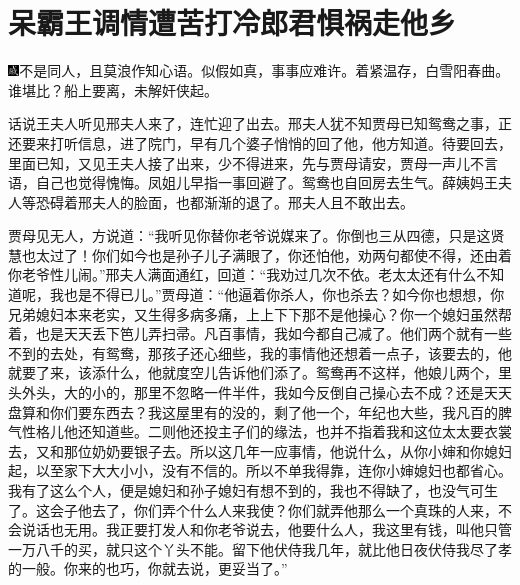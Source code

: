 

\chapter{呆霸王调情遭苦打\hspace{.5em}冷郎君惧祸走他乡}

{\includegraphics[width=3mm]{../Images/00005}不是同人，且莫浪作知心语。似假如真，事事应难许。着紧温存，白雪阳春曲。谁堪比？船上要离，未解奸侠起。}

话说王夫人听见邢夫人来了，连忙迎了出去。邢夫人犹不知贾母已知鸳鸯之事，正还要来打听信息，进了院门，早有几个婆子悄悄的回了他，他方知道。待要回去，里面已知，又见王夫人接了出来，少不得进来，先与贾母请安，贾母一声儿不言语，自己也觉得愧悔。凤姐儿早指一事回避了。鸳鸯也自回房去生气。薛姨妈王夫人等恐碍着邢夫人的脸面，也都渐渐的退了。邢夫人且不敢出去。

贾母见无人，方说道：``我听见你替你老爷说媒来了。你倒也三从四德，只是这贤慧也太过了！你们如今也是孙子儿子满眼了，你还怕他，劝两句都使不得，还由着你老爷性儿闹。''邢夫人满面通红，回道：``我劝过几次不依。老太太还有什么不知道呢，我也是不得已儿。''贾母道：``他逼着你杀人，你也杀去？如今你也想想，你兄弟媳妇本来老实，又生得多病多痛，上上下下那不是他操心？你一个媳妇虽然帮着，也是天天丢下笆儿弄扫帚。凡百事情，我如今都自己减了。他们两个就有一些不到的去处，有鸳鸯，那孩子还心细些，我的事情他还想着一点子，该要去的，他就要了来，该添什么，他就度空儿告诉他们添了。鸳鸯再不这样，他娘儿两个，里头外头，大的小的，那里不忽略一件半件，我如今反倒自己操心去不成？还是天天盘算和你们要东西去？我这屋里有的没的，剩了他一个，年纪也大些，我凡百的脾气性格儿他还知道些。二则他还投主子们的缘法，也并不指着我和这位太太要衣裳去，又和那位奶奶要银子去。所以这几年一应事情，他说什么，从你小婶和你媳妇起，以至家下大大小小，没有不信的。所以不单我得靠，连你小婶媳妇也都省心。我有了这么个人，便是媳妇和孙子媳妇有想不到的，我也不得缺了，也没气可生了。这会子他去了，你们弄个什么人来我使？你们就弄他那么一个真珠的人来，不会说话也无用。我正要打发人和你老爷说去，他要什么人，我这里有钱，叫他只管一万八千的买，就只这个丫头不能。留下他伏侍我几年，就比他日夜伏侍我尽了孝的一般。你来的也巧，你就去说，更妥当了。''


